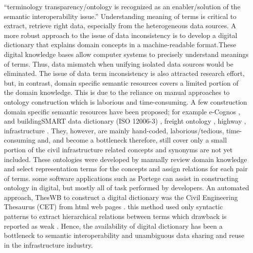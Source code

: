 \documentclass[Journal, BackFigs, DoubleSpace]{ascelike} %
\begin{document}
\cite{ouksel99} ``terminology transparency/ontology is recognized as an enabler/solution of the semantic interoperability issue.'' Understanding meaning of terms is critical to extract, retrieve right data, especially from the heterogeneous data sources. A more robust approach to the issue of data inconsistency is to develop a digital dictionary that explains domain concepts in a machine-readable format.These digital knowledge bases allow computer systems to precisely understand meanings of terms. Thus, data mismatch when unifying isolated data sources would be eliminated. The issue of data term inconsistency is also attracted research effort, but, in contrast, domain specific semantic resources covers a limited portion of the domain knowledge. This is due to the reliance on manual approaches to ontology construction which is laborious and time-consuming. A few construction domain specific semantic resources have been proposed; for example e-Cognos \cite{wetherill02}, and buildingSMART data dictionary (ISO 12006-3) \cite{buildingsmartData}, freight ontology \cite{seedah15}, highway \cite{el-diraby05}, infrastructure \cite{osman06}. They, however, are mainly hand-coded, laborious/tedious, time-consuming and, and become a bottleneck therefore, still cover only a small portion of the civil infrastructure related concepts and synonyms are not yet included. These ontologies were developed by manually review domain knowledge and select representation terms for the concepts and assign relations for each pair of terms. some software applications such as Portege can assist in constructing ontology in digital, but mostly all of task performed by developers. An automated approach, ThesWB to construct a digital dictionary was the Civil Engineering Thesaurus (CET) from html web pages \cite{abuzir02}. this method used only syntactic patterns to extract hierarchical relations between terms which drawback is reported as weak \cite{Marcus95}. Hence, the availability of digital dictionary has been a bottleneck to semantic interoperability and unambiguous data sharing and reuse in the infrastructure industry. 
\end{document}
